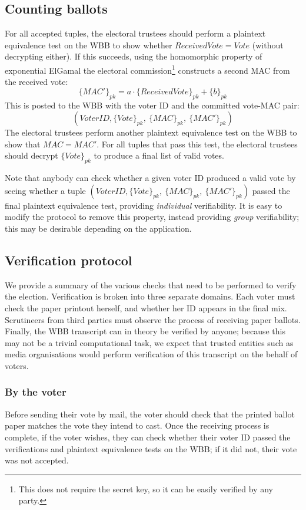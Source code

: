 \documentclass[11pt,twoside,a4paper]{article}
\theoremstyle{definition}
\begin{document}
\subsection{Counting ballots}
For all accepted tuples, the electoral trustees should perform a plaintext equivalence test on the WBB to show whether \(ReceivedVote=Vote\) (without decrypting either). If this succeeds, using the homomorphic property of exponential ElGamal the electoral commission\footnote{This does not require the secret key, so it can be easily verified by any party.} constructs a second MAC from the received vote:
\[\{MAC'\}_{pk}=a\cdot\{ReceivedVote\}_{pk}+\{b\}_{pk}\]
This is posted to the WBB with the voter ID and the committed vote-MAC pair:
\[\left(VoterID, \{Vote\}_{pk},\ \{MAC\}_{pk},\ \{MAC'\}_{pk}\right)\]
The electoral trustees perform another plaintext equivalence test on the WBB to show that \(MAC=MAC'\). For all tuples that pass this test, the electoral trustees should decrypt \(\{Vote\}_{pk}\) to produce a final list of valid votes.

Note that anybody can check whether a given voter ID produced a valid vote by seeing whether a tuple \(\left(VoterID, \{Vote\}_{pk},\ \{MAC\}_{pk},\ \{MAC'\}_{pk}\right)\) passed the final plaintext equivalence test, providing \textit{individual} verifiability. It is easy to modify the protocol to remove this property, instead providing \textit{group} verifiability; this may be desirable depending on the application.
\subsection{Verification protocol}
We provide a summary of the various checks that need to be performed to verify the election. Verification is broken into three separate domains. Each voter must check the paper printout herself, and whether her ID appears in the final mix. Scrutineers from third parties must observe the process of receiving paper ballots. Finally, the WBB transcript can in theory be verified by anyone; because this may not be a trivial computational task, we expect that trusted entities such as media organisations would perform verification of this transcript on the behalf of voters.

\subsubsection{By the voter}
Before sending their vote by mail, the voter should check that the printed ballot paper matches the vote they intend to cast. Once the receiving process is complete, if the voter wishes, they can check whether their voter ID passed the verifications and plaintext equivalence tests on the WBB; if it did not, their vote was not accepted.
\end{document}
